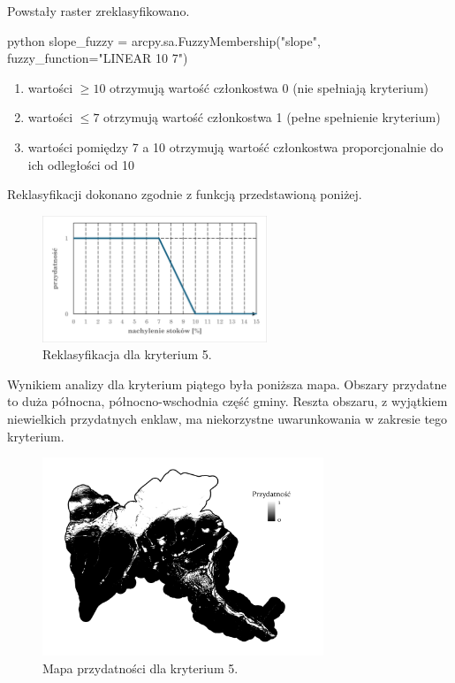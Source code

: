 \documentclass{article}
\begin{document}
Powstały raster zreklasyfikowano.
\vspace{5pt}

\begin{mintedbox}{python}
slope_fuzzy = arcpy.sa.FuzzyMembership("slope", fuzzy_function="LINEAR 10 7")
\end{mintedbox}

\begin{enumerate}[label=•]
    \item wartości \( \geq 10 \) otrzymują wartość członkostwa 0 (nie spełniają kryterium)
    \item wartości \( \leq 7 \) otrzymują wartość członkostwa 1 (pełne spełnienie kryterium)
    \item wartości pomiędzy 7 a 10 otrzymują wartość członkostwa proporcjonalnie do ich odległości od 10
\end{enumerate}
\vspace{10pt}

Reklasyfikacji dokonano zgodnie z funkcją przedstawioną poniżej.
\vspace{5pt}

\begin{figure}[H]
    \centering
    \includegraphics[width=0.6\textwidth]{img/kryterium5-wykres-glowny.png}
    \caption{Reklasyfikacja dla kryterium 5.}
\end{figure}
\vspace{10pt}

Wynikiem analizy dla kryterium piątego była poniższa mapa.
Obszary przydatne to duża północna, północno-wschodnia część gminy. Reszta obszaru, z wyjątkiem niewielkich przydatnych enklaw, ma niekorzystne uwarunkowania w zakresie tego kryterium.

\vspace{5pt}

\begin{figure}[H]
    \centering
    \includegraphics[width=0.75\textwidth]{img/kryterium5-layout.jpg}
    \caption{Mapa przydatności dla kryterium 5.}
\end{figure}
\vspace{10pt}
\end{document}
